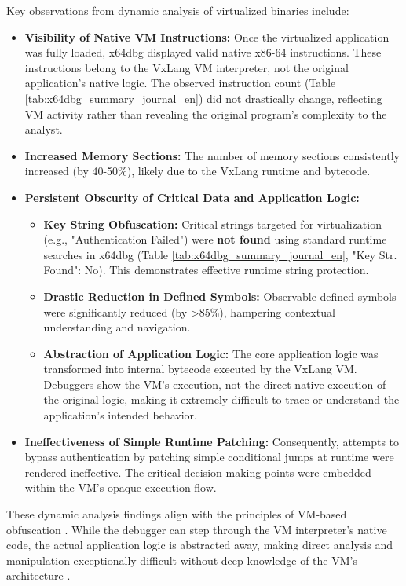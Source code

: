 Key observations from dynamic analysis of virtualized binaries include:
\begin{itemize}
    \item \textbf{Visibility of Native VM Instructions:} Once the virtualized application was fully loaded, x64dbg displayed valid native x86-64 instructions. These instructions belong to the VxLang VM interpreter, not the original application's native logic. The observed instruction count (Table \ref{tab:x64dbg_summary_journal_en}) did not drastically change, reflecting VM activity rather than revealing the original program's complexity to the analyst.
    \item \textbf{Increased Memory Sections:} The number of memory sections consistently increased (by 40-50\%), likely due to the VxLang runtime and bytecode.
    \item \textbf{Persistent Obscurity of Critical Data and Application Logic:}
        \begin{itemize}
            \item \textbf{Key String Obfuscation:} Critical strings targeted for virtualization (e.g., "Authentication Failed") were \textbf{not found} using standard runtime searches in x64dbg (Table \ref{tab:x64dbg_summary_journal_en}, "Key Str. Found": No). This demonstrates effective runtime string protection.
            \item \textbf{Drastic Reduction in Defined Symbols:} Observable defined symbols were significantly reduced (by >85\%), hampering contextual understanding and navigation.
            \item \textbf{Abstraction of Application Logic:} The core application logic was transformed into internal bytecode executed by the VxLang VM. Debuggers show the VM's execution, not the direct native execution of the original logic, making it extremely difficult to trace or understand the application's intended behavior.
        \end{itemize}
    \item \textbf{Ineffectiveness of Simple Runtime Patching:} Consequently, attempts to bypass authentication by patching simple conditional jumps at runtime were rendered ineffective. The critical decision-making points were embedded within the VM's opaque execution flow.
\end{itemize}
These dynamic analysis findings align with the principles of VM-based obfuscation \cite{Sikorski2012, Ore06}. While the debugger can step through the VM interpreter's native code, the actual application logic is abstracted away, making direct analysis and manipulation exceptionally difficult without deep knowledge of the VM's architecture \cite{Salwan2018SymbolicDeobfuscation}.

